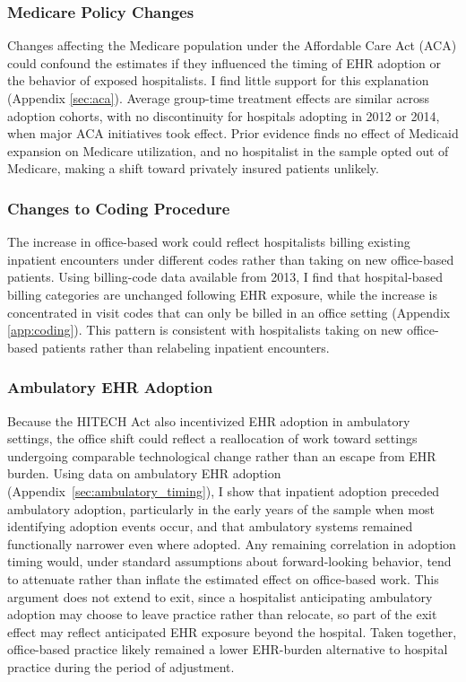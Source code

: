 \documentclass[12pt]{article}
\begin{document}
\subsubsection{Medicare Policy Changes}

Changes affecting the Medicare population under the Affordable Care Act (ACA) could confound the estimates if they influenced the timing of EHR adoption or the behavior of exposed hospitalists. I find little support for this explanation (Appendix \ref{sec:aca}). Average group-time treatment effects are similar across adoption cohorts, with no discontinuity for hospitals adopting in 2012 or 2014, when major ACA initiatives took effect. Prior evidence finds no effect of Medicaid expansion on Medicare utilization, and no hospitalist in the sample opted out of Medicare, making a shift toward privately insured patients unlikely.


\subsubsection{Changes to Coding Procedure}

The increase in office-based work could reflect hospitalists billing existing inpatient encounters under different codes rather than taking on new office-based patients. Using billing-code data available from 2013, I find that hospital-based billing categories are unchanged following EHR exposure, while the increase is concentrated in visit codes that can only be billed in an office setting (Appendix \ref{app:coding}). This pattern is consistent with hospitalists taking on new office-based patients rather than relabeling inpatient encounters.


\subsubsection{Ambulatory EHR Adoption}

Because the HITECH Act also incentivized EHR adoption in ambulatory settings, the office shift could reflect a reallocation of work toward settings undergoing comparable technological change rather than an escape from EHR burden. Using data on ambulatory EHR adoption (Appendix~\ref{sec:ambulatory_timing}), I show that inpatient adoption preceded ambulatory adoption, particularly in the early years of the sample when most identifying adoption events occur, and that ambulatory systems remained functionally narrower even where adopted. Any remaining correlation in adoption timing would, under standard assumptions about forward-looking behavior, tend to attenuate rather than inflate the estimated effect on office-based work. This argument does not extend to exit, since a hospitalist anticipating ambulatory adoption may choose to leave practice rather than relocate, so part of the exit effect may reflect anticipated EHR exposure beyond the hospital. Taken together, office-based practice likely remained a lower EHR-burden alternative to hospital practice during the period of adjustment.
\end{document}
